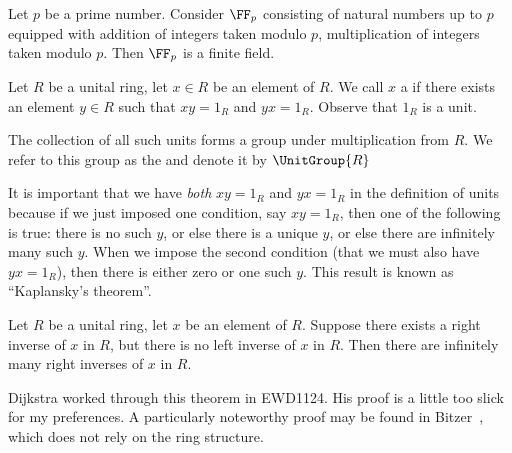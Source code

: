 \begin{example}
Let $p$ be a prime number. Consider $\FF_{p}$ consisting of natural
numbers up to $p$ equipped with addition of integers taken modulo $p$,
multiplication of integers taken modulo $p$. Then $\FF_{p}$ is a
finite field.
\end{example}

\begin{definition}
Let $R$ be a unital ring, let $x\in R$ be an element of $R$.
We call $x$ a  if there exists an element $y\in R$
such that $xy=1_{R}$ and $yx=1_{R}$. Observe that $1_{R}$ is a unit.

The collection of all such units forms a group under multiplication
from $R$. We refer to this group as the  and
denote it by $\UnitGroup{R}$
\end{definition}

\begin{remark}
It is important that we have \emph{both} $xy=1_{R}$ and $yx=1_{R}$ in
the definition of units because if we just imposed one condition, say
$xy=1_{R}$, then one of the following is true: there is no such $y$,
or else there is a unique $y$, or else there are infinitely many such $y$.
When we impose the second condition (that we must also have $yx=1_{R}$),
then there is either zero or one such $y$. This result is known as
``Kaplansky's theorem''.
\end{remark}

\begin{theorem}
Let $R$ be a unital ring, let $x$ be an element of $R$.
Suppose there exists a right inverse of $x$ in $R$, but there is no
left inverse of $x$ in $R$. Then there are infinitely many right
inverses of $x$ in $R$.
\end{theorem}

Dijkstra worked through this theorem in EWD1124. His proof is a little
too slick for my preferences. A particularly noteworthy proof may be
found in Bitzer~\cite{bitzer1963inverses}, which does not rely on the
ring structure.

